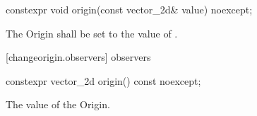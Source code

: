 \begin{itemdecl}
constexpr void origin(const vector_2d& value) noexcept;
\end{itemdecl}
\begin{itemdescr}
\pnum
\effects
The Origin shall be set to the value of .
\end{itemdescr}

 [changeorigin.observers]{ observers}

\begin{itemdecl}
constexpr vector_2d origin() const noexcept;
\end{itemdecl}
\begin{itemdescr}
\pnum
\returns
The value of the Origin.
\end{itemdescr}
